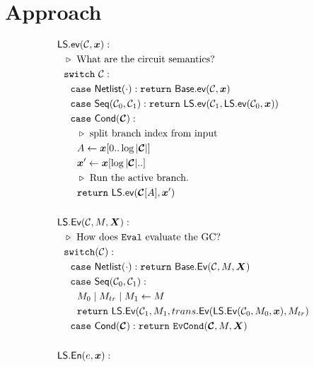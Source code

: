 \section{Approach}\label{sec:approach}

\begin{figure}
  \begin{adjustwidth}{-0.1\textwidth}{-0.1\textwidth}
  \centering
  \begin{minipage}[t]{0.56\linewidth}
    \begin{align*}
      &\ourscheme.\gev(\cir, \cirinp):\\
      &~~\codecomment{What are the circuit semantics?}\\
      &~~\switch~\cir:\\
      &~~~~\ccase~\netlist(\cdot): \creturn~\underscheme.\gev(\cir, \cirinp)\\
      &~~~~\ccase~\sequential(\cir_0, \cir_1):
      \creturn~\ourscheme.\gev(\cir_1, \ourscheme.\gev(\cir_0,
      \cirinp))\\
      &~~~~\ccase~\conditional(\vec{\cir}):\\
      &~~~~~~\codecomment{split branch index from input}\\
      &~~~~~~\aid \gets \cirinp[0..\log |\vec \cir|]\\
      &~~~~~~\cirinp' \gets \cirinp[\log |\vec \cir|..]\\
      &~~~~~~\codecomment{Run the active branch.}\\
      &~~~~~~\creturn~\ourscheme.\gev(\vec{\cir}[\aid], \cirinp')\\
      \\
      &\ourscheme.\gEv(\cir,\mat,\gcirinp):\\
      &~~\codecomment{How does \E evaluate the GC?}\\
      &~~\switch(\cir):\\
      &~~~~\ccase~\netlist(\cdot): \creturn~\underscheme.\gEv(\cir,\mat,\gcirinp)\\
      &~~~~\ccase~\sequential(\cir_0, \cir_1): \\
      &~~~~~~\mat_0\mid\mat_{tr}\mid\mat_1 \gets \mat\\
      &~~~~~~\creturn~\ourscheme.\gEv(\cir_1, \mat_1, \evtranslate(\ourscheme.\gEv(\cir_0, \mat_0, \cirinp), \mat_{tr})\\
      &~~~~\ccase~\conditional(\vec \cir): \creturn~\evcond(\vec \cir,
      \mat, \gcirinp)\\
      \\
      &\ourscheme.\gEn(e,\cirinp):\\

\end{align*}
\end{minipage}
\end{adjustwidth}
\end{figure}
